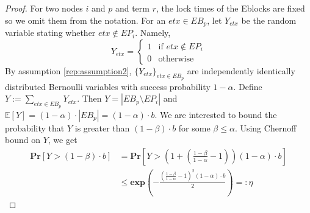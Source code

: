   \begin{proof} For two nodes $i$ and $p$ and term $r$, the lock times of the Eblocks are fixed so we omit them from the notation. For an $etx\in EB_p$, let $Y_{etx}$ be the random variable stating whether $etx\notin EP_i$. Namely, 
	 \begin{equation}
    Y_{etx} =
    \begin{cases}
      1  &\mbox{if }  etx\notin EP_i \\
      0  &\mbox{otherwise}
    \end{cases}
  \end{equation}
  By assumption \ref{rep:assumption2}, $\{Y_{etx}\}_{etx\in EB_p}$ are independently identically distributed Bernoulli variables with success probability $1-\alpha$. Define $Y:=\sum_{etx\in EB_p} Y_{etx}$. Then $Y=|EB_p\setminus EP_i|$ and $\mathbb{E}[Y]=(1-\alpha)\cdot|EB_p|=(1-\alpha)\cdot b$. We are interested to bound the probability that $Y$ is greater than $(1-\beta)\cdot b$ for some $\beta\leq \alpha$. Using Chernoff bound on $Y$, we get
 \begin{equation}\begin{split}\label{eq:rep_chernoff}
 \textbf{Pr}\left[Y>(1-\beta) \cdot b\right]&=\textbf{Pr}\left[Y>\left(1+\left(\frac{1-\beta}{1-\alpha}-1\right)\right)(1-\alpha)\cdot  b\right]\\
 &\leq \textbf{exp}\left(-\frac{\left(\frac{1-\beta}{1-\alpha}-1\right)^2(1-\alpha) \cdot b}{2}\right)=:\eta 
\end{split} \end{equation}


\end{proof}
